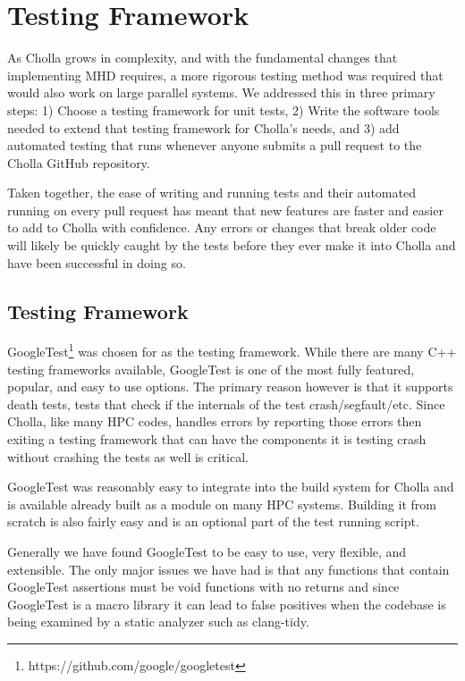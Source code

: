 \section{Testing Framework}
\label{sec:testing}

As Cholla grows in complexity, and with the fundamental changes that implementing MHD requires, a more rigorous testing method was required  that would also work on large parallel systems. We addressed this in three primary steps: 1) Choose a testing framework for unit tests, 2) Write the software tools needed to extend that testing framework for Cholla's needs, and 3) add automated testing that runs whenever anyone submits a pull request to the Cholla GitHub repository. 

Taken together, the ease of writing and running tests and their automated running on every pull request has meant that new features are faster and easier to add to Cholla with confidence. Any errors or changes that break older code will likely be quickly caught by the tests before they ever make it into Cholla and have been successful in doing so.

\subsection{Testing Framework}

GoogleTest\footnote{https://github.com/google/googletest} was chosen for as the testing framework. While there are many C++ testing frameworks available, GoogleTest is one of the most fully featured, popular, and easy to use options. The primary reason however is that it supports death tests, tests that check if the internals of the test crash/segfault/etc. Since Cholla, like many HPC codes, handles errors by reporting those errors then exiting a testing framework that can have the components it is testing crash without crashing the tests as well is critical.

GoogleTest was reasonably easy to integrate into the build system for Cholla and is available already built as a module on many HPC systems. Building it from scratch is also fairly easy and is an optional part of the test running script.

Generally we have found GoogleTest to be easy to use, very flexible, and extensible. The only major issues we have had is that any functions that contain GoogleTest assertions must be void functions with no returns and since GoogleTest is a macro library it can lead to false positives when the codebase is being examined by a static analyzer such as clang-tidy.

